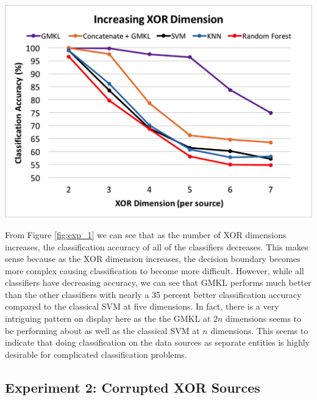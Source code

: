 \documentclass{article}
\begin{document}
\begin{minipage}{\textwidth}
\centering
\includegraphics[scale=0.4]{experimentpic1.png}
\label{fig:exp_1}
\end{minipage}


From Figure \ref{fig:exp_1} we can see that as the number of XOR dimensions
increases, the classification accuracy of all of the classifiers decreases.
This makes sense because as the XOR dimension increases, the
decision boundary becomes more complex causing classification to become more
difficult. However, while all classifiers have decreasing accuracy, we can see
that GMKL performs much better than the other classifiers with nearly a 35
percent better classification accuracy compared to the classical SVM at five
dimensions. In fact, there is a very intriguing pattern on display here as the
the GMKL at $2n$ dimensions seems to be performing about as well as the
classical SVM at $n$ dimensions. This seems to indicate that doing
classification on the data sources as separate entities is highly desirable for
complicated classification problems.











\subsection*{Experiment 2: Corrupted XOR Sources}
\end{document}
